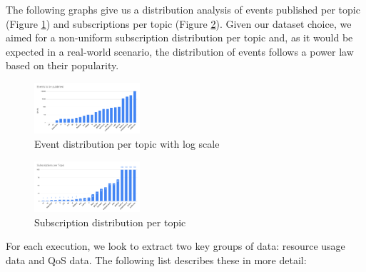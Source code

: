 The following graphs give us a distribution analysis of events published per
topic (Figure \ref{fig:events-to-be-publisher-per-topic}) and subscriptions per
topic (Figure \ref{fig:subscriptions-per-topic}). Given our dataset choice, we
aimed for a non-uniform subscription distribution per topic and, as it would be
expected in a real-world scenario, the distribution of events follows a power
law based on their popularity. 

\begin{figure}[!htb]
  \centering
  \includegraphics[width=0.35\textwidth]{img/events-to-be-publisher-per-topic.png}
  \caption{Event distribution per topic with log scale}
  \label{fig:events-to-be-publisher-per-topic}
\end{figure}

\begin{figure}[!htb]
  \centering
  \includegraphics[width=0.35\textwidth]{img/subscriptions-per-topic.png}
  \caption{Subscription distribution per topic}
  \label{fig:subscriptions-per-topic}
\end{figure}

For each execution, we look to extract two key groups of data: resource usage
data and QoS data. The following list describes these in more detail:

